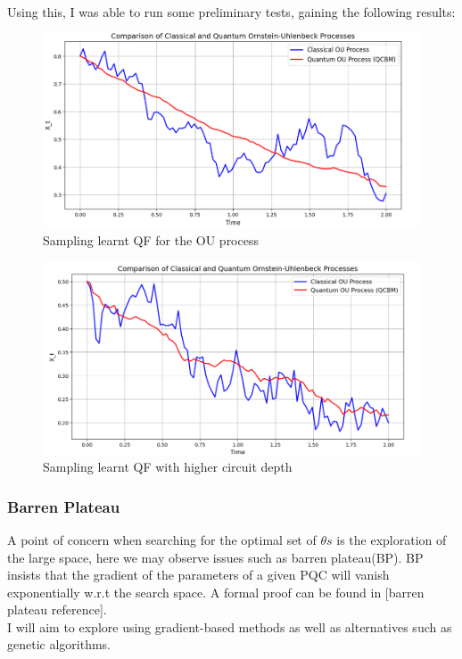 \documentclass[12pt]{article}
\numberwithin{equation}{section}
\begin{document}
\\ 
Using this, I was able to run some preliminary tests, gaining the following results:
\begin{figure}[h]
    \centering
    \includegraphics[scale=0.75]{Quantile1.png}
    \caption{Sampling learnt QF for the OU process}
\end{figure}
\begin{figure}[h]
    \centering
    \includegraphics[scale=0.75]{Quantile2.png}
    \caption{Sampling learnt QF with higher circuit depth}
\end{figure}

\subsubsection{Barren Plateau}
A point of concern when searching for the optimal set of $\theta s$ is the exploration 
of the large space, here we may observe issues such as barren plateau(BP). BP 
insists that the gradient of the parameters of a given PQC will vanish exponentially 
w.r.t the search space. A formal proof can be found in [barren plateau reference]. 
\\ 
I will aim to explore using gradient-based methods as well as alternatives such 
as genetic algorithms. 
\end{document}
